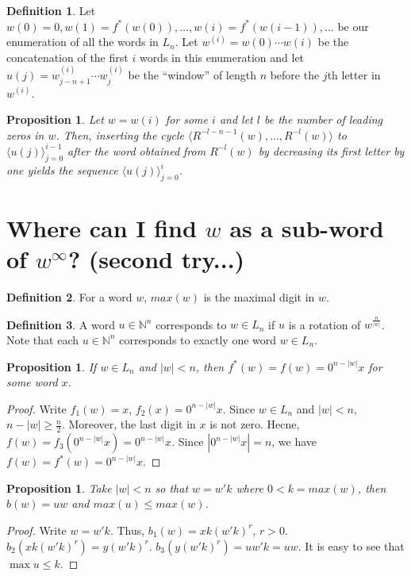\documentclass{article}
\newtheorem{proposition}[theorem]{Proposition}
\theoremstyle{definition}
\newtheorem{definition}{Definition}
\newcommand{\T}[1]{\langle{#1}\rangle}
\begin{document}
\begin{definition}
	Let $w(0)=0, w(1)=f^*(w(0)),\dots,w(i)=f^*(w{(i-1)}),\dots$ be our enumeration of all the words in $L_n$. Let $w^{(i)}=w(0)\cdots w(i)$ be the concatenation of the first $i$ words in this enumeration and let $u(j)=w^{(i)}_{j-n+1}\cdots w^{(i)}_j$ be the ``window'' of length $n$ before the $j$th letter in $w^{(i)}$.
\end{definition}

\begin{proposition}
	Let $w=w(i)$ for some $i$ and let $l$ be the number of leading zeros in $w$.
	Then, inserting the cycle $\T{R^{-l-n-1}(w),\dots,R^{-l}(w)}$ to $\T{u(j)}_{j=0}^{i-1}$
	after the word obtained from $R^{-l}(w)$ by decreasing its first letter by one
	yields the sequence $\T{u(j)}_{j=0}^{i}$.
\end{proposition}	




\section{Where can I find $w$ as a sub-word of $w^\infty$? (second try...)}
		
\begin{definition}
For a word $w$, $max(w)$ is the maximal digit in $w$.
\end{definition}

\begin{definition}
A word $u\in \mathbb{N}^n$ corresponds to $w\in L_n$ if $u$ is a rotation of $w^{\frac{n}{|w|}}$. Note that each $u\in \mathbb{N}^n$ corresponds to exactly one word $w\in L_n$.
\end{definition}

\begin{proposition}
\label{newforward}
If $w\in L_n$ and $|w|<n$, then $f^*(w)=f(w)=0^{n-|w|}x$ for some word $x$.
\end{proposition}
\begin{proof}
Write $f_1(w)=x$, $f_2(x)=0^{n-|w|}x$. Since $w\in L_n$ and $|w|<n$, $n-|w|\geq \frac{n}{2}$. Moreover, the last digit in $x$ is not zero. Hecne, $f(w)=f_3(0^{n-|w|}x)=0^{n-|w|}x$. Since $|0^{n-|w|}x|=n$, we have $f(w)=f^*(w)=0^{n-|w|}x$.
\end{proof}

\begin{proposition}
\label{1-back}
Take $|w|<n$ so that $w=w'k$ where $0<k=max(w)$, then $b(w)=uw$ and $max(u)\leq max(w)$. 
\end{proposition}
\begin{proof}
Write $w=w'k$. Thus, $b_1(w)=xk(w'k)^r$, $r>0$. $b_2(xk(w'k)^r)=y(w'k)^r$. $b_3(y(w'k)^r)=uw'k=uw$. It is easy to see that $\max{u}\leq k$.
\end{proof}
\end{document}
